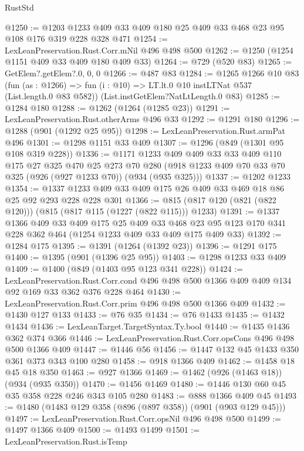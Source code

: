 \begin{lexlean}{RustStd}
\begin{coremodule}
@1250 := @1203 @1233 @409 @33 @409 @180 @25 @409 @33 @468 @23 @95 @108 @176 @319 @228 @328 @471
@1254 := LexLeanPreservation.Rust.Corr.mNil @496 @498 @500
@1262 := @1250 (@1254 @1151 @409 @33 @409 @180 @409 @33)
@1264 := @729 (@520 @83)
@1265 := GetElem?.getElem?.{0, 0, 0}
@1266 := @487 @83
@1284 := @1265
    @1266
    @10
    @83
    (fun (as : @1266) => fun (i : @10) => LT.lt.{0} @10 instLTNat @537 (List.length.{0} @83 @582))
    (List.instGetElem?NatLtLength.{0} @83)
@1285 := @1284 @180
@1288 := @1262 (@1264 (@1285 @23))
@1291 := LexLeanPreservation.Rust.otherArms @496 @33
@1292 := @1291 @180
@1296 := @1288 (@901 (@1292 @25 @95))
@1298 := LexLeanPreservation.Rust.armPat @496
@1301 := @1298 @1151 @33 @409
@1307 := @1296 (@849 (@1301 @95 @108 @319 @228))
@1336 := @1171
    @1233
    @409
    @409
    @33
    @33
    @409
    @110
    @175
    @27
    @325
    @470
    @25
    @273
    @70
    @280
    (@918 @1233 @409 @70 @33 @70 @325 (@926 (@927 @1233 @70)) (@934 (@935 @325)))
@1337 := @1202 @1233
@1354 := @1337 @1233 @409 @33 @409 @175 @26 @409 @33 @469 @18 @86 @25 @92 @293 @228 @228 @301
@1366 := @815 (@817 @120 (@821 (@822 @120))) (@815 (@817 @115 (@1227 (@822 @115))) @1233)
@1391 := @1337
    @1366
    @409
    @33
    @409
    @175
    @25
    @409
    @33
    @468
    @23
    @95
    @123
    @170
    @341
    @228
    @362
    @464
    (@1254 @1233 @409 @33 @409 @175 @409 @33)
@1392 := @1284 @175
@1395 := @1391 (@1264 (@1392 @23))
@1396 := @1291 @175
@1400 := @1395 (@901 (@1396 @25 @95))
@1403 := @1298 @1233 @33 @409
@1409 := @1400 (@849 (@1403 @95 @123 @341 @228))
@1424 := LexLeanPreservation.Rust.Corr.cond
    @496
    @498
    @500
    @1366
    @409
    @409
    @134
    @92
    @169
    @33
    @362
    @376
    @228
    @464
@1430 := LexLeanPreservation.Rust.Corr.prim @496 @498 @500 @1366 @409
@1432 := @1430 @127 @133
@1433 := @76 @35
@1434 := @76 @1433
@1435 := @1432 @1434
@1436 := LexLeanTarget.TargetSyntax.Ty.bool
@1440 := @1435 @1436 @362 @374 @366
@1446 := LexLeanPreservation.Rust.Corr.opsCons @496 @498 @500 @1366 @409
@1447 := @1446 @56
@1456 := @1447 @132 @45 @1433 @350 @361 @373 @343 @100 @280
@1458 := @918 @1366 @409
@1462 := @1458 @18 @45 @18 @350
@1463 := @927 @1366
@1469 := @1462 (@926 (@1463 @18)) (@934 (@935 @350))
@1470 := @1456 @1469
@1480 := @1446 @130 @60 @45 @35 @358 @228 @246 @343 @105 @280
@1483 := @888 @1366 @409 @45
@1493 := @1480 (@1483 @129 @358 (@896 (@897 @358)) (@901 (@903 @129 @45)))
@1497 := LexLeanPreservation.Rust.Corr.opsNil @496 @498 @500
@1499 := @1497 @1366 @409
@1500 := @1493 @1499
@1501 := LexLeanPreservation.Rust.isTemp

\end{coremodule}
\end{lexlean}
